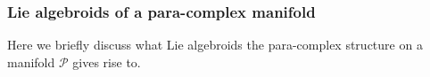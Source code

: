 \documentclass[letterpaper,12pt]{article}
\newcommand{\PS}{\mathcal{P}}
\newcommand{\p}{\partial}
\newcommand{\pt}{\tilde{\partial}}
\newcommand{\brac}{[\ ,\ ]}
\newcommand{\Mt}{\tl{M}}
\def\tl{\tilde}
\theoremstyle{definition}
\newtheorem{Def}[theorem]{Definition}
\theoremstyle{remark}
\theoremstyle{examples}
\begin{document}
%
%

\subsubsection{Lie algebroids of a para-complex manifold}\label{lie_algds_paracpx}
Here we briefly discuss what Lie algebroids the para-complex structure on a manifold $\PS$ gives rise to.
\end{document}
